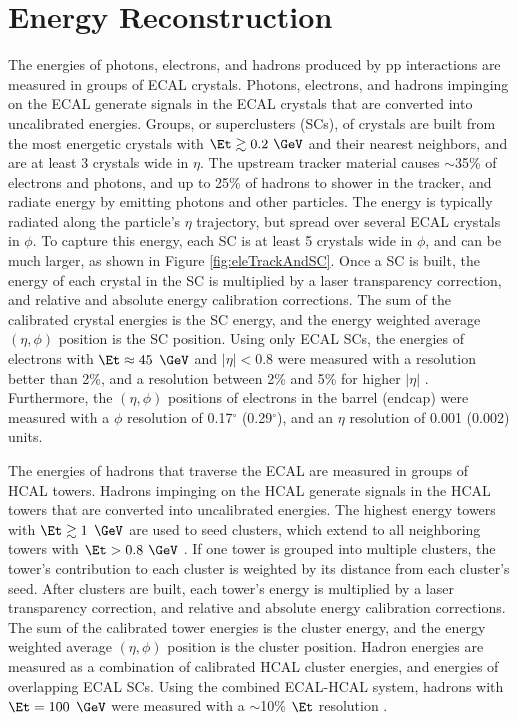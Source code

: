 \section{Energy Reconstruction}
\label{sec:enrgReco}
The energies of photons, electrons, and hadrons produced by pp interactions are measured in groups of ECAL crystals.  Photons, 
electrons, and hadrons impinging on the ECAL generate signals in the ECAL crystals that are converted into uncalibrated energies.  Groups, 
or superclusters (SCs), of crystals are built from the most energetic crystals with $\Et \gtrsim 0.2$ $\GeV$ and their nearest 
neighbors, and are at least 3 crystals wide in $\eta$.  The upstream tracker material causes $\sim$35\% of electrons and 
photons, and up to 25\% of hadrons \cite{trackerPerformanceInCollisions} to shower in the tracker, and radiate energy by emitting 
photons and other particles.  The energy is typically radiated along the particle's $\eta$ trajectory, but spread over several ECAL 
crystals in $\phi$.  To capture this energy, each SC is at least 5 crystals wide in $\phi$, and can be much larger, 
as shown in Figure \ref{fig:eleTrackAndSC}.  Once a SC is built, the energy of each crystal in the SC is multiplied by a laser 
transparency correction, and relative and absolute energy calibration corrections.  The sum of the calibrated crystal energies 
is the SC energy, and the energy weighted average $(\eta,\phi)$ position is the SC position.  Using only ECAL SCs, the energies of 
electrons with $\Et \approx 45$ $\GeV$ and $|\eta| < 0.8$ were measured with a resolution better than 2\%, and a resolution between 
2\% and 5\% for higher $|\eta|$ \cite{ecalPerformanceInCollisions}.  Furthermore, the $(\eta,\phi)$ positions of electrons in the 
barrel (endcap) were measured with a $\phi$ resolution of 0.17$^{\circ}$ (0.29$^{\circ}$), and an $\eta$ resolution of 0.001 (0.002) 
units.

The energies of hadrons that traverse the ECAL are measured in groups of HCAL towers.  Hadrons impinging on the HCAL generate signals 
in the HCAL towers that are converted into uncalibrated energies.  The highest energy towers with $\Et \gtrsim 1$ $\GeV$ are used to 
seed clusters, which extend to all neighboring towers with $\Et > 0.8$ $\GeV$ \cite{pflowEventReco}.  If one tower is grouped into 
multiple clusters, the tower's contribution to each cluster is weighted by its distance from each cluster's seed.  After clusters are 
built, each tower's energy is multiplied by a laser transparency correction, and relative and absolute energy calibration corrections.  
The sum of the calibrated tower energies is the cluster energy, and the energy weighted average $(\eta,\phi)$ position is the cluster 
position.  Hadron energies are measured as a combination of calibrated HCAL cluster energies, and energies of overlapping ECAL SCs.  
Using the combined ECAL-HCAL system, hadrons with $\Et = 100$ $\GeV$ were measured with a $\sim$10\% $\Et$ resolution \cite{pflowEventReco}.


